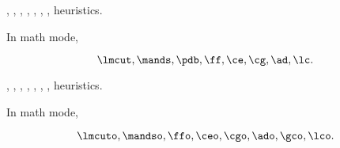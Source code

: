\lmcut, \mands, \pdb, \ff, \ce, \cg, \ad, \lc heuristics.

In math mode,

\[
 \lmcut, \mands, \pdb, \ff, \ce, \cg, \ad, \lc.
\]

\lmcuto, \mandso, \ffo, \ceo, \cgo, \ado, \gco, \lco heuristics.

In math mode,

\[
 \lmcuto, \mandso, \ffo, \ceo, \cgo, \ado, \gco, \lco.
\]


